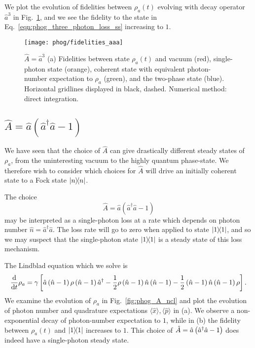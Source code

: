 We plot the evolution of fidelities between $\rho_a\left(t\right)$ evolving with decay operator $\hat{a}^3$ in Fig.~\ref{fig:phog_lindblad_three_photon_loss}, and we see the fidelity to the state in Eq.~\ref{eqn:phog_three_photon_loss_ss} increasing to $1$. 

\begin{figure}[htp]
\centering
\texttt{[image: phog/fidelities\_aaa]}
\caption{\label{fig:phog_lindblad_three_photon_loss}$\hat{A} = \hat{a}^3$ (a) Fidelities between state $\rho_a\left(t\right)$ and vacuum (red), single-photon state (orange), coherent state with equivalent photon-number expectation to $\rho_a$ (green), and the two-phase state (blue).  Horizontal gridlines displayed in black, dashed. Numerical method: direct integration.}
\end{figure}
\fi

\clearpage
\subsection{$\hat{A} = \hat{a}\left(\hat{a}^\dagger \hat{a} - 1\right)$}\label{sec:A_ncl}
We have seen that the choice of $\hat{A}$ can give drastically different steady states of $\rho_a$,  from the uninteresting vacuum to the highly quantum phase-state. We therefore wish to consider which choices for $\hat{A}$ will drive an initially coherent state to a Fock state $\dyad{n}$. 

The choice 
\begin{equation}\label{eqn:phog_A_ncl}
\hat{A} = \hat{a}\left(\hat{a}^\dagger \hat{a} - 1\right)
\end{equation}
may be interpreted as a single-photon loss at a rate which depends on photon number $\hat{n} = \hat{a}^\dagger \hat{a}$. The loss rate will go to zero when applied to state $\dyad{1}$, and so we may suspect that the single-photon state $\dyad{1}$ is a steady state of this loss mechanism.

The Lindblad equation which we solve is
\begin{equation}\label{eqn:phog_ncl_lindblad}
\frac{\mathrm{d}}{\mathrm{d}t} \rho_a = \gamma \left[ \hat{a}\left(\hat{n}-1\right) \rho \left(\hat{n}-1\right)\hat{a}^\dagger - \frac{1}{2} \rho \left(\hat{n}-1\right) \hat{n} \left(\hat{n}-1\right) - \frac{1}{2} \left(\hat{n}-1\right)\hat{n}\left(\hat{n}-1\right) \rho \right].
\end{equation}
We examine the evolution of $\rho_a$ in Fig.~\ref{fig:phog_A_ncl} and plot the evolution of photon number and quadrature expectations $\langle \hat{x}\rangle, \langle \hat{p}\rangle$ in (a). We observe a non-exponential decay of photon-number expectation to $1$,
while in (b) the fidelity between $\rho_a\left(t\right)$ and $\dyad{1}$ increases to $1$. This choice of $\hat{A} = \hat{a}\left(\hat{a}^\dagger \hat{a} - 1\right)$ does indeed have a single-photon steady state. 

